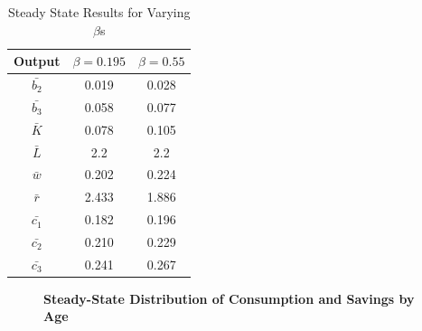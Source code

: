 \documentclass[letterpaper,12pt]{article}
\theoremstyle{definition}
\begin{document}
\begin{table}[ht]
	\captionsetup{width=6.0in}
	\caption{Steady State Results for Varying $\beta$s} %
	\centering 
	\begin{tabular}{c c c} %
		\hline\hline %
		Output & $\beta=0.195$ & $\beta=0.55$ \\ [0.5ex] %
		\hline %
		$\bar{b_2}$ & 0.019 & 0.028  \\ %
		$\bar{b_3}$ & 0.058 & 0.077  \\
		$\bar{K}$ & 0.078 & 0.105 \\
		$\bar{L}$ & 2.2 & 2.2 \\
		$\bar{w}$ & 0.202 & 0.224 \\
		$\bar{r}$ & 2.433 & 1.886 \\ 
		$\bar{c_1}$ & 0.182 & 0.196 \\ 
		$\bar{c_2}$ & 0.210 & 0.229 \\ 
		$\bar{c_3}$ & 0.241 & 0.267 \\ [1ex] %
		\hline %
	\end{tabular}
	\label{table1} %
\end{table}

\begin{figure}[htb]\centering
	\captionsetup{width=4.0in}
	\caption{\textbf{Steady-State Distribution of Consumption and Savings by Age}}
	\label{Fig1}
\end{figure}
\end{document}
